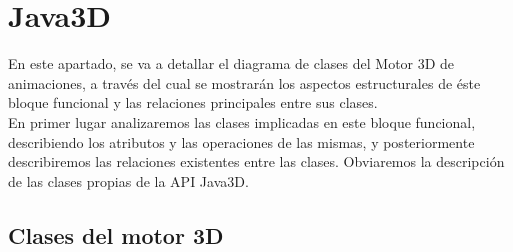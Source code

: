 \chapter{Java3D}
En este apartado, se va a detallar el diagrama de clases del Motor 3D de animaciones, a través del cual se mostrarán los
aspectos estructurales de éste bloque funcional y las relaciones principales entre sus clases.\\

En primer lugar analizaremos las clases implicadas en este bloque funcional, describiendo los atributos y las operaciones 
de las mismas, y posteriormente describiremos las relaciones existentes entre las clases. Obviaremos la descripción de las
clases propias de la API Java3D.\\

   \section{Clases del motor 3D}

